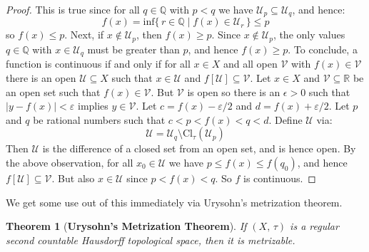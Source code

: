 \documentclass{article}
\theoremstyle{plain}
\newtheorem{theorem}{Theorem}[section]
\theoremstyle{normal}
\begin{document}
\begin{proof}
            This is true since for all $q\in\mathbb{Q}$ with $p<q$ we have
            $\mathcal{U}_{p}\subseteq\mathcal{U}_{q}$, and hence:
            \begin{equation}
                f(x)
                =\textrm{inf}\big\{\,r\in\mathbb{Q}\;|\;
                    f(x)\in\mathcal{U}_{r}\,\big\}
                \leq{p}
            \end{equation} 
            so $f(x)\leq{p}$. Next, if $x\notin\mathcal{U}_{p}$, then
            $f(x)\geq{p}$. Since $x\notin\mathcal{U}_{p}$, the only values
            $q\in\mathbb{Q}$ with $x\in\mathcal{U}_{q}$ must be greater than
            $p$, and hence $f(x)\geq{p}$. To conclude, a function
            is continuous if and only if for all $x\in{X}$ and all open
            $\mathcal{V}$ with $f(x)\in\mathcal{V}$ there is an open
            $\mathcal{U}\subseteq{X}$ such that $x\in\mathcal{U}$ and
            $f[\mathcal{U}]\subseteq\mathcal{V}$. Let $x\in{X}$ and
            $\mathcal{V}\subseteq\mathbb{R}$ be an open set such that
            $f(x)\in\mathcal{V}$. But $\mathcal{V}$ is open so there is an
            $\epsilon>0$ such that $|y-f(x)|<\varepsilon$ implies
            $y\in\mathcal{V}$. Let $c=f(x)-\varepsilon/2$ and
            $d=f(x)+\varepsilon/2$. Let $p$ and $q$ be rational numbers such
            that $c<p<f(x)<q<d$. Define $\mathcal{U}$ via:
            \begin{equation}
                \mathcal{U}=\mathcal{U}_{q}
                    \setminus\textrm{Cl}_{\tau}(\mathcal{U}_{p})
            \end{equation}
            Then $\mathcal{U}$ is the difference of a closed set from an open
            set, and is hence open. By the above observation, for all
            $x_{0}\in\mathcal{U}$ we have $p\leq{f}(x)\leq{f}(q_{0})$, and hence
            $f[\mathcal{U}]\subseteq\mathcal{V}$. But also
            $x\in\mathcal{U}$ since $p<f(x)<q$. So $f$ is continuous.
        \end{proof}
        We get some use out of this immediately via Urysohn's metrization
        theorem.
        \begin{theorem}[\textbf{Urysohn's Metrization Theorem}]
            If $(X,\,\tau)$ is a regular second countable Hausdorff topological
            space, then it is metrizable.
        \end{theorem}
\end{document}
